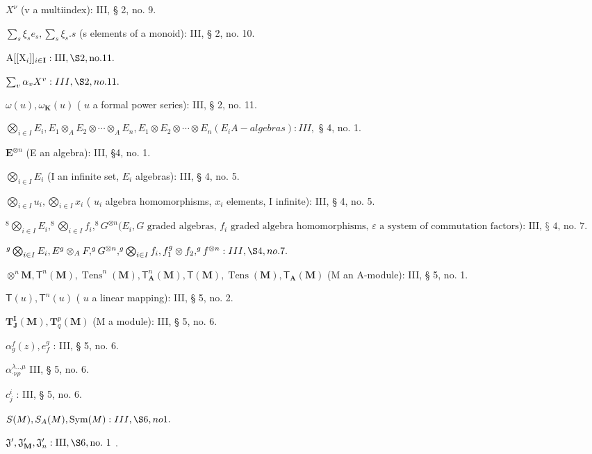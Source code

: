 \(X^{\nu}\) (v a multiindex): III, § 2, no. 9.

\(\sum_{s} \xi_{s} e_{s}, \sum_{s} \xi_{s}. s\) (s elements of a monoid): III, § 2, no. 10.

\(\mathrm{A}[[\mathrm{X}_i]]_{i \in \mathbf{I}}: \mathrm{III}, \S 2, \mathrm{no.} 11.\)

\(\sum_{v} \alpha_v X^v: III, \S 2, no. 11.\)

\(\omega(u), \omega_{\mathbf{K}}(u)\) ( \(u\) a formal power series): III, § 2, no. 11.

\(\bigotimes_{i \in I} E_i, E_1 \otimes_A E_2 \otimes \cdots \otimes_A E_n, E_1 \otimes E_2 \otimes \cdots \otimes E_n (E_i A-algebras): III,\) § 4, no. 1.

\(\mathbf{E}^{\otimes n}\) (E an algebra): III, §4, no. 1.

\(\bigotimes_{i \in I} E_i\) (I an infinite set, \(E_i\) algebras): III, § 4, no. 5.

\(\bigotimes_{i \in I} u_i, \bigotimes_{i \in I} x_i\) ( \(u_i\) algebra homomorphisms, \(x_i\) elements, I infinite): III, § 4, no. 5.

\(^{8}\bigotimes_{i\in I}E_{i},^{8}\bigotimes_{i\in I}f_{i},^{8}G^{\otimes n}(E_{i},G\text{ graded algebras, }f_{i}\text{ graded algebra homomorphisms, }\varepsilon\text{ a system of commutation factors): III, § 4, no. 7.}\)

\(^{g}\bigotimes_{i\in I}E_{i},E^{g}\otimes_{A}F,^{g}G^{\otimes n},^{g}\bigotimes_{i\in I}f_{i},f_{1}^{g}\otimes f_{2},^{g}f^{\otimes n}:III,\S4,no.7.\)

\(\otimes^{n}\mathbf{M},\mathsf{T}^{n}(\mathbf{M}),\operatorname {Tens}^{n}(\mathbf{M}),\mathsf{T}_{\mathbf{A}}^{n}(\mathbf{M}),\mathsf{T}(\mathbf{M}),\operatorname {Tens}(\mathbf{M}),\mathsf{T}_{\mathbf{A}}(\mathbf{M})\) (M an A-module): III, § 5, no. 1.

\(\mathsf{T}(u), \mathsf{T}^n(u)\) ( \(u\) a linear mapping): III, § 5, no. 2.

\(\mathbf{T}_{\mathbf{J}}^{\mathbf{I}}(\mathbf{M}), \mathbf{T}_{q}^{p}(\mathbf{M})\) (M a module): III, § 5, no. 6.

\(\alpha_{g}^{f}(z), e_{f}^{g}\) : III, § 5, no. 6.

\(\alpha_{\cdot \nu \rho}^{\lambda \dots \mu}\) III, § 5, no. 6.

\(c_{j}^{i}\) : III, § 5, no. 6.

\(S(M), S_{A}(M), \text{Sym}(M): III, \S 6, no 1.\)

\(\mathfrak{J}^{\prime}, \mathfrak{J}_{\mathbf{M}}^{\prime}, \mathfrak{J}_{n}^{\prime}: \mathrm{III}, \S 6, \mathrm{no.~1}\) .

